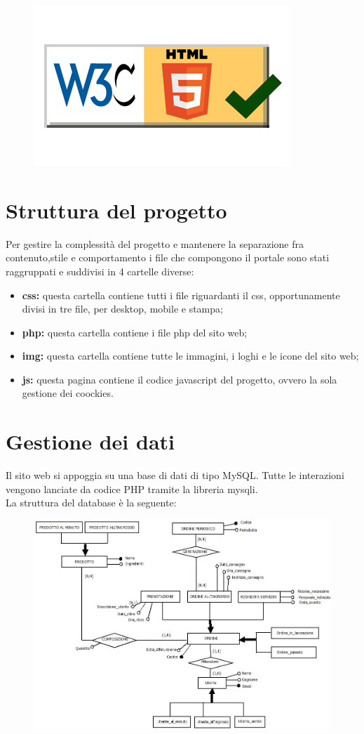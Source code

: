 \begin{figure}[h!]
	\includegraphics[width=0.2\linewidth]{StyleLatex/badge-html5.png}
\end{figure}

\section{Struttura del progetto}

Per gestire la complessità del progetto e mantenere la separazione fra contenuto,stile e comportamento i file che compongono il portale sono stati raggruppati e suddivisi in 4 cartelle diverse:

\begin{itemize}
	\item \textbf{css:} questa cartella contiene tutti i file riguardanti il css, opportunamente divisi in tre file, per desktop, mobile e stampa;
	\item \textbf{php:} questa cartella contiene i file php del sito web;
	\item \textbf{img:} questa cartella contiene tutte le immagini, i loghi e le icone del sito web;
	\item \textbf{js:}  questa pagina contiene il codice javascript del progetto, ovvero la sola gestione dei coockies.
\end{itemize}

\newpage

\section{Gestione dei dati}

Il sito web si appoggia su una base di dati di tipo MySQL. Tutte le interazioni vengono lanciate da codice PHP tramite la libreria mysqli.\\
La struttura del database è la seguente:

\begin{figure}[h!]
	\includegraphics[width=1\linewidth]{StyleLatex/ERTecWeb.jpeg}
\end{figure}

